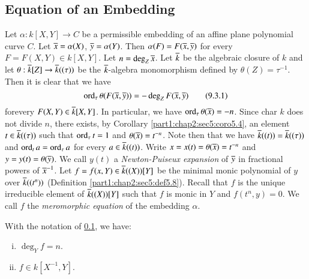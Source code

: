 \subsection{Equation of an Embedding}\label{part1:chap4:sec9:ss9.3}
Let $\alpha: k [X, Y] \to C$ be a permissible embedding of an affine plane polynomial curve $C$. Let $\overline{x}= \alpha (X)$, $\overline{y}= \alpha(Y)$. Then $\alpha(F)= F(\overline{x}, \overline{y})$ for every $F= F(X, Y) \in k [X, Y]$. Let $n= \deg_{Z}\overline{x}$. Let $\overline{k}$ be the algebraic closure of $k$ and let $\theta: \overline{k} [Z] \to \overline{k} ((\tau))$ be the $\overline{k}$-algebra monomorphism defined by $\theta (Z)= \tau^{-1}$. Then it is clear that we have
\begin{equation*}
  \operatorname{ord}_\tau \theta (F (\overline{x}, \overline{y})) =- \deg_Z F(\overline{x}, \overline{y}) \tag{9.3.1} \label{part1:chap4:sec9:eq9.3.1}
\end{equation*}
for\pageoriginale every $F(X, Y) \in \overline{k} [X, Y]$. In particular, we
have $\operatorname{ord}_\tau \theta (\overline{x})= - n$. Since char $k$ does not divide
$n$, there exists, by Corollary \ref{part1:chap2:sec5:coro5.4}, an
element $t \in \overline{k} ((\tau))$ such that $\operatorname{ord}_\tau t=1$ and $\theta
(\overline{x})= t^{-n}$. Note then that we have $\overline{k} ((t))= \overline{k}
((\tau))$ and $\operatorname{ord}_t a = \operatorname{ord}_\tau a$ for every $a \in \overline{k}
((t))$. Write $x= x(t)= \theta (\overline{x})= t^{-n}$ and $y= y(t)=\theta
(\overline{y})$. We call $y(t)$ a {\em Newton-Puiseux expansion} of $\overline{y}$
in fractional powers of $\overline{x}^{-1}$. Let $f= f(x, Y) \in \overline{k}
((X)) [Y]$ be the minimal monic polynomial of $y$ over $\overline{k}
((t^n))$ (Definition \ref{part1:chap2:sec5:def5.8}). Recall that $f$
is the unique irreducible element of $\overline{k}((X)) [Y]$ such that $f$
is monic in $Y$ and $f(t^n, y)=0$. We call $f$ the {\em meromorphic
  equation} of the embedding $\alpha$. 

\setcounter{thm}{3}
\begin{lemma}\label{part1:chap4:sec9:lem9.4}
  With the notation of \ref{part1:chap4:sec9:ss9.3}, we have:
\begin{enumerate}[(i)]
\item $\deg_Y f=n$.
\item $f \in k [X^{-1}, Y]$.
\end{enumerate}
\end{lemma}

